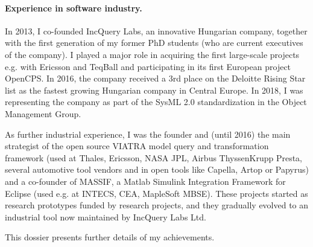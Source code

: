 
\paragraph{Experience in software industry.}
In 2013, I co-founded IncQuery Labs, an innovative Hungarian company, together with the first generation of my former PhD students (who are current executives of the company). I played a major role in acquiring the first large-scale projects e.g. with Ericsson and TeqBall and participating in its first European project OpenCPS. In 2016, the company received a 3rd place on the Deloitte Rising Star list as the fastest growing Hungarian company in Central Europe. In 2018, I was representing the company as part of the SysML 2.0 standardization in the Object Management Group. 

As further industrial experience, I was the founder and (until 2016) the main strategist of the open source VIATRA model query and transformation framework (used at Thales, Ericsson, NASA JPL, Airbus ThyssenKrupp Presta, several automotive tool vendors and in open tools like Capella, Artop or Papyrus) and a co-founder of MASSIF, a Matlab Simulink Integration Framework for Eclipse (used e.g. at INTECS, CEA, MapleSoft MBSE).  These projects started as research prototypes funded by research projects, and they gradually evolved to an industrial tool now maintained by IncQuery Labs Ltd.


This dossier presents further details of my achievements. 
